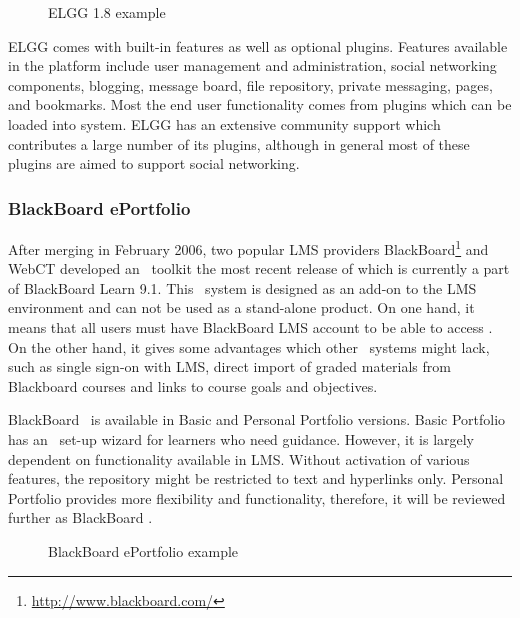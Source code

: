 \begin{figure}[htb]
\centering
\setlength\fboxsep{0pt}
\setlength\fboxrule{0.5pt}
\caption{ELGG 1.8 example}
\label{fig:elgg}
\end{figure}

ELGG comes with built-in features as well as optional plugins. Features
available in the platform include user management and administration, social
networking components, blogging, message board, file repository, private
messaging, pages, and bookmarks. Most the end user functionality comes from
plugins which can be loaded into system. ELGG has an extensive community support
which contributes a large number of its plugins, although in general most of
these plugins are aimed to support social networking.

\subsubsection{BlackBoard ePortfolio}
After merging in February 2006, two popular LMS providers
BlackBoard\footnote{\url{http://www.blackboard.com/}} and WebCT developed an
\ep~toolkit the most recent release of which is currently a part of BlackBoard
Learn 9.1. This \ep~system is designed as an add-on to the LMS environment and
can not be used as a stand-alone product. On one hand, it means that all users
must have BlackBoard LMS account to be able to access \ep. On the other hand, it
gives some advantages which other \ep~systems might lack, such as single sign-on
with LMS, direct import of graded materials from Blackboard courses and links to
course goals and objectives.

BlackBoard \ep~is available in Basic and Personal Portfolio versions. Basic
Portfolio has an \ep~set-up wizard for learners who need guidance. However, it
is largely dependent on functionality available in LMS. Without activation of
various features, the repository might be restricted to text and hyperlinks
only. Personal Portfolio provides more flexibility and functionality, therefore,
it will be reviewed further as BlackBoard \ep.

\begin{figure}[htb]
\centering 
\setlength\fboxsep{0pt}
\setlength\fboxrule{0.5pt}
\fbox{\texttt{[image: CH4-F6-BB]}}
\caption[BlackBoard ePortfolio example]{BlackBoard ePortfolio example
\citep{UniversityofTorontoScarborough2010}}
\label{fig:bbep}
\end{figure}


